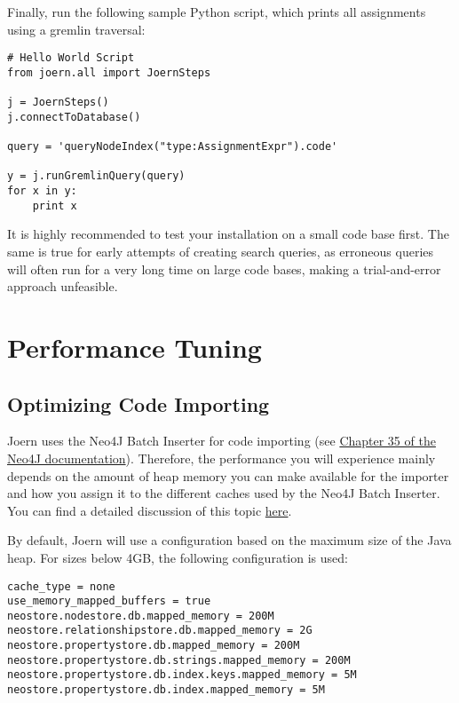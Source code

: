 \documentclass[a4paper]{article}
\begin{document}
Finally, run the following sample Python script, which prints all
assignments using a gremlin traversal:

\begin{verbatim}
# Hello World Script
from joern.all import JoernSteps

j = JoernSteps()
j.connectToDatabase()

query = 'queryNodeIndex("type:AssignmentExpr").code'

y = j.runGremlinQuery(query)
for x in y:
    print x
\end{verbatim}

It is highly recommended to test your installation on a small code
base first. The same is true for early attempts of creating search
queries, as erroneous queries will often run for a very long time on
large code bases, making a trial-and-error approach unfeasible.

\section{Performance Tuning}
\label{sec:performance}

\subsection{Optimizing Code Importing}

Joern uses the Neo4J Batch Inserter for code importing (see
\href{http://docs.neo4j.org/chunked/stable/batchinsert.html}{Chapter
  35 of the Neo4J documentation}). Therefore, the performance you will
experience mainly depends on the amount of heap memory you can make
available for the importer and how you assign it to the different
caches used by the Neo4J Batch Inserter. You can find a detailed
discussion of this topic
\href{https://github.com/jexp/batch-import}{here}.

By default, Joern will use a configuration based on the maximum size
of the Java heap. For sizes below 4GB, the following configuration is
used:

\begin{verbatim}
cache_type = none
use_memory_mapped_buffers = true
neostore.nodestore.db.mapped_memory = 200M
neostore.relationshipstore.db.mapped_memory = 2G
neostore.propertystore.db.mapped_memory = 200M
neostore.propertystore.db.strings.mapped_memory = 200M
neostore.propertystore.db.index.keys.mapped_memory = 5M
neostore.propertystore.db.index.mapped_memory = 5M
\end{verbatim}
\end{document}
